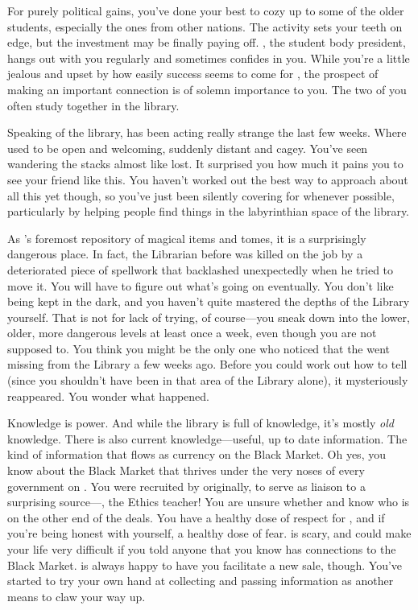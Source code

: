 \documentclass[char]{GL2020}
\begin{document}
For purely political gains, you've done your best to cozy up to some of the older students, especially the ones from other nations. The activity sets your teeth on edge, but the investment may be finally paying off. \cPresident{\full}, the student body president, hangs out with you regularly and sometimes confides in you. While you're a little jealous and upset by how easily success seems to come for \cPresident{}, the prospect of making an important connection is of solemn importance to you. The two of you often study together in the library.

Speaking of the library, \cLibrarian{} has been acting really strange the last few weeks. Where \cLibrarian{\they} used to be open and welcoming, \cLibrarian{\theyare} suddenly distant and cagey. You've seen \cLibrarian{\them} wandering the stacks almost like \cLibrarian{\they} \cLibrarian{\were} lost. It surprised you how much it pains you to see your friend like this. You haven't worked out the best way to approach \cLibrarian{\them} about all this yet though, so you've just been silently covering for \cLibrarian{\them} whenever possible, particularly by helping people find things in the labyrinthian space of the library. 

As \pEarth{}'s foremost repository of magical items and tomes, it is a surprisingly dangerous place. In fact, the Librarian before \cLibrarian{} was killed on the job by a deteriorated piece of spellwork that backlashed unexpectedly when he tried to move it. You will have to figure out what's going on eventually. You don't like being kept in the dark, and you haven't quite mastered the depths of the Library yourself. That is not for lack of trying, of course---you sneak down into the lower, older, more dangerous levels at least once a week, even though you are not supposed to. You think you might be the only one who noticed that the \iScythe{} went missing from the Library a few weeks ago. Before you could work out how to tell \cLibrarian{} (since you shouldn't have been in that area of the Library alone), it mysteriously reappeared. You wonder what happened.

Knowledge is power. And while the library is full of knowledge, it's mostly \emph{old} knowledge. There is also current knowledge---useful, up to date information. The kind of information that flows as currency on the Black Market. Oh yes, you know about the Black Market that thrives under the very noses of every government on \pEarth{}. You were recruited by \cChupSecond{\full} originally, to serve as liaison to a surprising source---\cEthics{\full}, the Ethics teacher! You are unsure whether \cEthics{} and \cChupSecond{} know who is on the other end of the deals. You have a healthy dose of respect for \cChupSecond{}, and if you're being honest with yourself, a healthy dose of fear. \cChupSecond{\They} is scary, and could make your life very difficult if you told anyone that you know \cChupSecond{} has connections to the Black Market. \cChupSecond{\They} is always happy to have you facilitate a new sale, though. You've started to try your own hand at collecting and passing information as another means to claw your way up.
\end{document}

